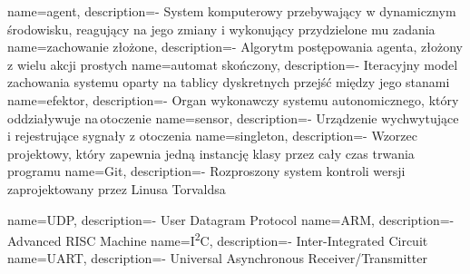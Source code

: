  {name=agent, description={- System komputerowy przebywający w dynamicznym środowisku, reagujący na jego zmiany i wykonujący przydzielone mu zadania}}
 {name=zachowanie złożone, description={- Algorytm postępowania agenta, złożony z wielu akcji prostych}}
 {name=automat skończony, description={- Iteracyjny model zachowania systemu oparty na tablicy dyskretnych przejść między jego stanami}}
 {name=efektor, description={- Organ wykonawczy systemu autonomicznego, który oddziaływuje na\,otoczenie}}
 {name=sensor, description={- Urządzenie wychwytujące i rejestrujące sygnały z otoczenia}}
 {name=singleton, description={- Wzorzec projektowy, który zapewnia jedną instancję klasy przez cały czas trwania programu}}
 {name=Git, description={- Rozproszony system kontroli wersji zaprojektowany przez Linusa Torvaldsa}}

 {name=UDP, description={- User Datagram Protocol}}
 {name=ARM, description={- Advanced RISC Machine}}
 {name=I\textsuperscript{2}C, description={- Inter-Integrated Circuit}}
 {name=UART, description={- Universal Asynchronous Receiver/Transmitter}}
